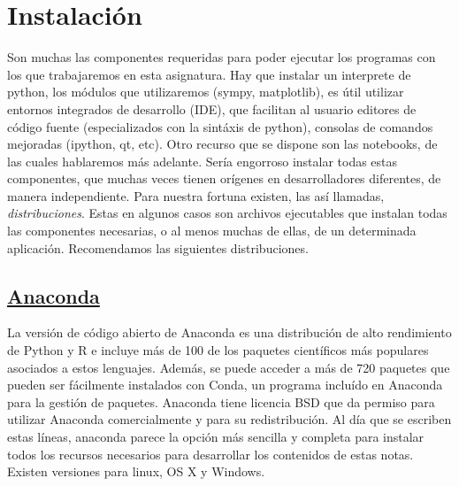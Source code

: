 % 
% 
% 
% 


\section{Instalación}


Son muchas las componentes requeridas para poder ejecutar los programas con los que trabajaremos 
en esta asignatura. Hay que instalar un interprete de python, los módulos que utilizaremos 
(sympy, matplotlib), es útil utilizar entornos integrados de desarrollo (IDE), que facilitan al usuario
editores de código fuente (especializados con la sintáxis de python), consolas de comandos
mejoradas (ipython, qt, etc). Otro recurso que se dispone son las notebooks, de las cuales 
hablaremos más adelante. Sería engorroso instalar todas estas componentes, que muchas veces 
tienen orígenes en desarrolladores diferentes, de manera independiente. Para nuestra fortuna
existen, las así llamadas, \emph{distribuciones}. Estas en algunos casos son archivos ejecutables que instalan todas 
las componentes necesarias, o al menos muchas  de ellas, de un determinada aplicación.
Recomendamos las siguientes distribuciones.  

\subsection{\href{https://www.continuum.io/downloads}{Anaconda}} 
La versión de código abierto de Anaconda es una distribución de alto rendimiento de Python y R 
e incluye más de 100 de los paquetes científicos más populares asociados a estos lenguajes.
Además, se puede acceder a más de 720 paquetes que pueden ser fácilmente instalados con Conda, 
 un programa incluído en Anaconda para la gestión de paquetes.
 Anaconda tiene licencia BSD que da permiso para utilizar Anaconda comercialmente 
 y para su redistribución. Al día que se escriben estas líneas, anaconda parece la opción más 
 sencilla y completa para instalar todos los recursos necesarios para desarrollar los contenidos de 
 estas notas. Existen versiones para linux, OS X y Windows. 



